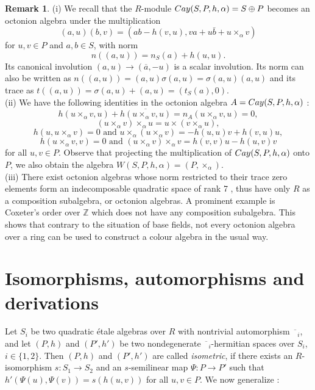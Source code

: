 \documentclass[10pt]{amsart}
\theoremstyle{plain}
\theoremstyle{definition}
\newtheorem{remark}[theorem]{Remark}
\newcommand{\can}{\overline{\phantom{x}}}
\begin{document}
\begin{remark}
(i) We recall that the $R$-module
${\rm Cay}(S,P,h,\alpha)=S\oplus P$ becomes an octonion algebra under the multiplication
$$(a,u)(b,v)=(ab-h(v,u), va+u\bar b+u\times_{\alpha}v)$$
for $u,v\in P$ and $a,b\in S$, with norm
$$n((a,u))=n_S(a)+h(u,u).$$
 Its canonical involution $(a,u)\rightarrow (\overline{a}, -u)$  is a scalar involution. Its norm can also be written as $ n((a,u))=(a,u) \sigma(a,u)= \sigma(a,u)(a, u)$
 and its trace as $ t((a,u))= \sigma(a,u)+(a, u)=(t_{S}(a),0)$.
   \\ (ii) We have the following identities in the octonion algebra $A={\rm Cay}(S,P,h,\alpha)$ \cite{T, Pu2}:
$$h(u\times_\alpha v,u)+\overline{h(u\times_\alpha v,u)}=n_A(u\times_\alpha v,u)=0,$$
$$(u\times_\alpha v) \times_\alpha u=u\times ( v \times_\alpha u),$$
$$h(u, u\times_\alpha v)=0 \text{ and } u\times_\alpha (u\times_\alpha v)=-h(u,u)v+h(v,u)u,$$
$$h( u\times_\alpha v,v)=0  \text{ and }(u\times_\alpha v)\times_\alpha v=h(v,v)u-h(u,v)v$$
 for all $u,v\in P$. Observe that projecting the multiplication of ${\rm Cay}(S,P,h,\alpha)$ onto $P$, we also obtain the algebra $W(S,P,h,\alpha)=(P,\times_\alpha)$.
\\ (iii)
There exist octonion algebras whose norm restricted to their trace zero elements form an indecomposable quadratic space of rank 7 \cite{KPS}, thus have only $R$ as a composition subalgebra, or octonion algebras. A prominent example is Coxeter's order over $\mathbb{Z}$ which does not have any composition subalgebra. This shows that contrary to the situation of base fields, not every octonion algebra over a ring can be used to construct a colour algebra in the usual way.
\end{remark}

\section{Isomorphisms, automorphisms and derivations}\label{sec:iso}

Let $S_i$ be two quadratic \'etale algebras over $R$ with nontrivial automorphism $\can_i$, and
let $(P,h)$ and $(P',h')$ be two nondegenerate $\can_i$-hermitian spaces over $S_i$, $i\in\{1,2\}$. Then  $(P,h)$ and $(P',h')$ are called \emph{isometric}, if there exists an $R$-isomorphism $s:S_1\rightarrow S_2$ and an $s$-semilinear map $\Psi: P\rightarrow P'$ such that
 $h'(\Psi(u),\Psi(v))=s(h(u,v))$ for all $u,v\in P$. We now generalize  \cite[Theorem 2.5]{EM}:
\end{document}
